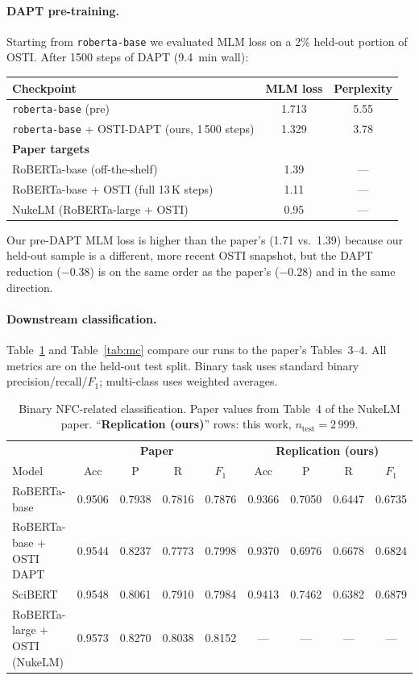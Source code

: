 \documentclass[11pt]{article}
\begin{document}
\paragraph{DAPT pre-training.} Starting from \texttt{roberta-base} we evaluated MLM loss on a 2\% held-out portion of OSTI. After 1500 steps of DAPT (9.4~min wall):
\begin{center}\footnotesize
\begin{tabular}{lcc}
\toprule
Checkpoint & MLM loss & Perplexity \\
\midrule
\texttt{roberta-base} (pre)              & 1.713 & 5.55 \\
\texttt{roberta-base} + OSTI-DAPT (ours, 1\,500 steps)  & 1.329 & 3.78 \\
\midrule
\textbf{Paper targets} & & \\
RoBERTa-base (off-the-shelf)              & 1.39  & --- \\
RoBERTa-base + OSTI (full 13\,K steps)    & 1.11  & --- \\
NukeLM (RoBERTa-large + OSTI)             & 0.95  & --- \\
\bottomrule
\end{tabular}
\end{center}
Our pre-DAPT MLM loss is higher than the paper's (1.71 vs.\ 1.39) because our held-out sample is a different, more recent OSTI snapshot, but the DAPT reduction ($-0.38$) is on the same order as the paper's ($-0.28$) and in the same direction.

\paragraph{Downstream classification.} Table~\ref{tab:bin} and Table~\ref{tab:mc} compare our runs to the paper's Tables~3--4. All metrics are on the held-out test split. Binary task uses standard binary precision/recall/$F_1$; multi-class uses weighted averages.

\begin{table}[h]
\centering
\caption{Binary NFC-related classification. Paper values from Table~4 of the NukeLM paper. ``\textbf{Replication (ours)}'' rows: this work, $n_{\text{test}}=2\,999$.}
\label{tab:bin}
\footnotesize
\begin{tabular}{lcccc|cccc}
\toprule
& \multicolumn{4}{c|}{\textbf{Paper}} & \multicolumn{4}{c}{\textbf{Replication (ours)}} \\
Model & Acc & P & R & $F_1$ & Acc & P & R & $F_1$ \\
\midrule
RoBERTa-base              & 0.9506 & 0.7938 & 0.7816 & 0.7876 & 0.9366 & 0.7050 & 0.6447 & 0.6735 \\
RoBERTa-base + OSTI DAPT  & 0.9544 & 0.8237 & 0.7773 & 0.7998 & 0.9370 & 0.6976 & 0.6678 & 0.6824 \\
SciBERT                   & 0.9548 & 0.8061 & 0.7910 & 0.7984 & 0.9413 & 0.7462 & 0.6382 & 0.6879 \\
RoBERTa-large + OSTI (NukeLM) & 0.9573 & 0.8270 & 0.8038 & 0.8152 & --- & --- & --- & --- \\
\bottomrule
\end{tabular}
\end{table}
\end{document}
